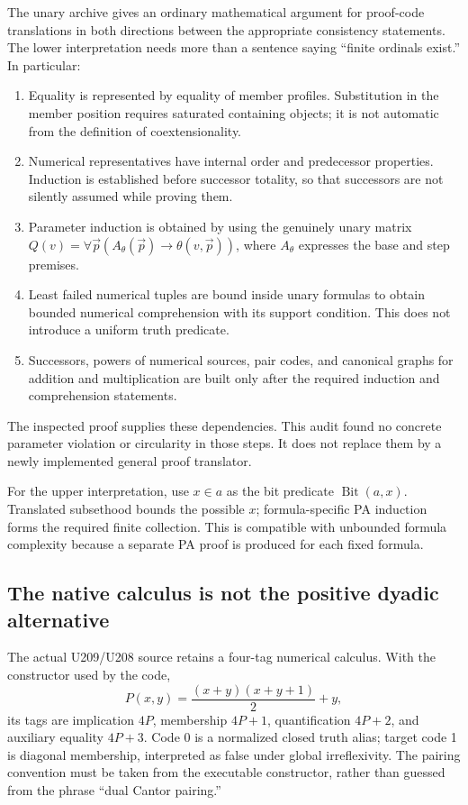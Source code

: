 \documentclass[11pt,a4paper]{article}
\begin{document}
The unary archive gives an ordinary mathematical argument for proof-code
translations in both directions between the appropriate consistency
statements. The lower interpretation needs more than a sentence saying
``finite ordinals exist.'' In particular:
\begin{enumerate}
\item Equality is represented by equality of member profiles. Substitution
in the member position requires saturated containing objects; it is not
automatic from the definition of coextensionality.
\item Numerical representatives have internal order and predecessor
properties. Induction is established before successor totality, so that
successors are not silently assumed while proving them.
\item Parameter induction is obtained by using the genuinely unary matrix
$Q(v)=\forall\vec p(A_\theta(\vec p)\to\theta(v,\vec p))$, where
$A_\theta$ expresses the base and step premises.
\item Least failed numerical tuples are bound inside unary formulas to
obtain bounded numerical comprehension with its support condition. This
does not introduce a uniform truth predicate.
\item Successors, powers of numerical sources, pair codes, and canonical
graphs for addition and multiplication are built only after the required
induction and comprehension statements.
\end{enumerate}
The inspected proof supplies these dependencies. This audit found no
concrete parameter violation or circularity in those steps. It does not
replace them by a newly implemented general proof translator.

For the upper interpretation, use $x\in a$ as the bit predicate
$\operatorname{Bit}(a,x)$. Translated subsethood bounds the possible $x$;
formula-specific PA induction forms the required finite collection. This
is compatible with unbounded formula complexity because a separate PA
proof is produced for each fixed formula.

\subsection{The native calculus is not the positive dyadic alternative}

The actual U209/U208 source retains a four-tag numerical calculus. With
the constructor used by the code,
\[
P(x,y)=\frac{(x+y)(x+y+1)}2+y,
\]
its tags are implication $4P$, membership $4P+1$, quantification $4P+2$,
and auxiliary equality $4P+3$. Code 0 is a normalized closed truth alias;
target code 1 is diagonal membership, interpreted as false under global
irreflexivity. The pairing convention must be taken from the executable
constructor, rather than guessed from the phrase ``dual Cantor pairing.''
\end{document}
